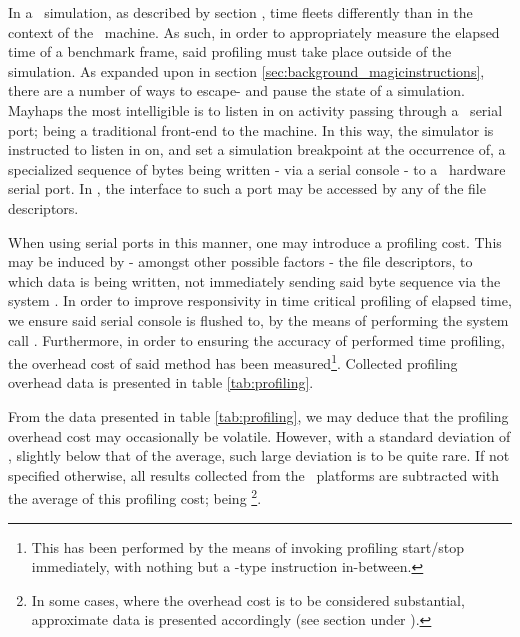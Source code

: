 In a \dvttermsimics\ simulation, as described by section , time fleets differently than in the context of the \dvttermhost\ machine.
As such, in order to appropriately measure the elapsed time of a benchmark frame, said profiling must take place outside of the simulation.
As expanded upon in section \ref{sec:background_magicinstructions}, there are a number of ways to escape- and pause the state of a simulation.
Mayhaps the most intelligible is to listen in on activity passing through a \dvttermtarget\ serial port; being a traditional front-end to the machine.
In this way, the simulator is instructed to listen in on, and set a simulation breakpoint at the occurrence of, a specialized sequence of bytes being written - via a serial console - to a \dvttermuart\ hardware serial port.
In \dvttermlinux , the interface to such a port may be accessed by any of the  file descriptors.


When using serial ports in this manner, one may introduce a profiling cost.
This may be induced by - amongst other possible factors - the file descriptors, to which data is being written, not immediately sending said byte sequence via the system \dvttermuart .
In order to improve responsivity in time critical profiling of elapsed time, we ensure said serial console is flushed to, by the means of performing the system call .
Furthermore, in order to ensuring the accuracy of performed time profiling, the overhead cost of said method has been measured\footnote{This has been performed by the means of invoking profiling start/stop immediately, with nothing but a -type instruction in-between.}.
Collected profiling overhead data is presented in table \ref{tab:profiling}.



From the data presented in table \ref{tab:profiling}, we may deduce that the profiling overhead cost may occasionally be volatile.
However, with a standard deviation of , slightly below that of the average, such large deviation is to be quite rare.
If not specified otherwise, all results collected from the \dvttermsimics\ platforms are subtracted with the average of this profiling cost; being \footnote{In some cases, where the overhead cost is to be considered substantial, approximate data is presented accordingly (see section  under ).}.\\


